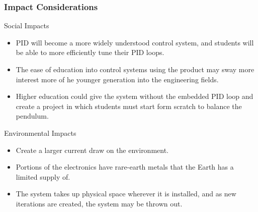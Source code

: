\documentclass[aspectratio=169]{beamer}
\begin{document}
\begin{frame}
    \frametitle{Impact Considerations}

    \begin{block}{Social Impacts}
        \begin{itemize}
            \item PID will become a more widely understood control system, and students will be able to more efficiently tune their PID loops.
            \item The ease of education into control systems using the product may sway more interest more of he younger generation into the engineering fields.
            \item Higher education could give the system without the embedded PID loop and create a project in which students must start form scratch to balance the pendulum.

        \end{itemize}
    \end{block}

    \begin{block}{Environmental Impacts}
        \begin{itemize}
            \item Create a larger current draw on the environment.
            \item Portions of the electronics have rare-earth metals that the Earth has a limited supply of.
            \item The system takes up physical space wherever it is installed, and as new iterations are created, the system may be thrown out.
        \end{itemize}
    \end{block}





\end{frame}
\end{document}
